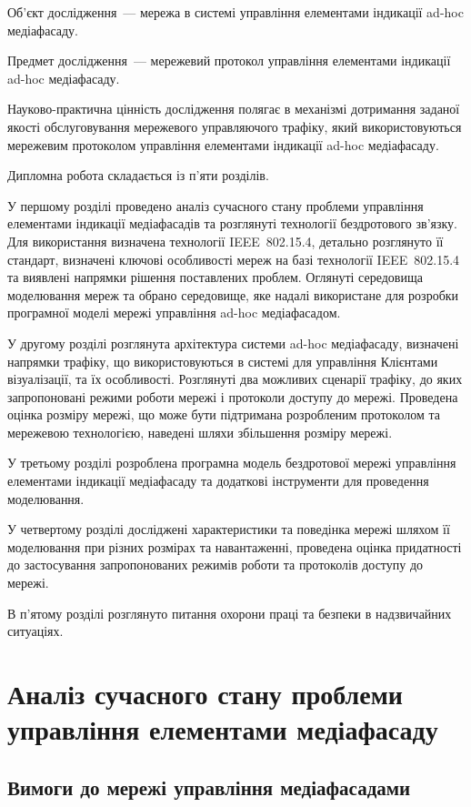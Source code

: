 \documentclass[a4paper,ukrainian,utf8,nocolumnsxix,nocolumnxxxii,nocolumnxxxi,floatsection,equationsection]{eskdtext}
\newcommand{\iee}[0]{IEEE~802.15.4\xspace}
\begin{document}
Об'єкт дослідження~--- мережа в системі управління елементами індикації ad-hoc медіафасаду.

Предмет дослідження~--- мережевий протокол управління елементами індикації ad-hoc медіафасаду.

Науково-практична цінність дослідження полягає в механізмі дотримання заданої якості обслуговування мережевого управляючого трафіку, який використовуються мережевим протоколом управління елементами індикації ad-hoc медіафасаду.

Дипломна робота складається із п'яти розділів.

У першому розділі проведено аналіз сучасного стану проблеми управління елементами індикації медіафасадів  та розглянуті технології бездротового зв'язку. Для використання визначена технології \iee, детально розглянуто її стандарт, визначені ключові особливості мереж на базі технології \iee та виявлені напрямки рішення поставлених проблем. Оглянуті середовища моделювання мереж та обрано середовище, яке надалі використане для розробки програмної моделі мережі управління ad-hoc медіафасадом.

У другому розділі розглянута архітектура системи ad-hoc медіафасаду, визначені напрямки трафіку, що використовуються в системі для управління Клієнтами візуалізації, та їх особливості. Розглянуті два можливих сценарії трафіку, до яких запропоновані режими роботи мережі і протоколи доступу до мережі. Проведена оцінка розміру мережі, що може бути підтримана розробленим протоколом та мережевою технологією, наведені шляхи збільшення розміру мережі.

У третьому розділі розроблена програмна модель бездротової мережі управління елементами індикації медіафасаду та додаткові інструменти для проведення моделювання.

У четвертому розділі досліджені характеристики та поведінка мережі шляхом її моделювання при різних розмірах та навантаженні, проведена оцінка придатності до застосування запропонованих режимів роботи та протоколів доступу до мережі.

В п'ятому розділі розглянуто питання охорони праці та безпеки в надзвичайних ситуаціях.

\section{Аналіз сучасного стану проблеми управління елементами медіафасаду}
\label{sec:1}

\subsection{Вимоги до мережі управління медіафасадами} 
\end{document}
